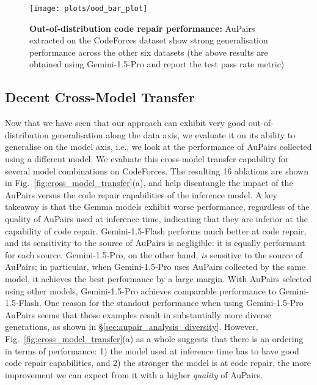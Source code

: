 \documentclass[11pt, a4paper, logo, copyright]{googledeepmind}
\def\aupairs/{\textcolor{golden}{Au}Pairs}
\begin{document}
\begin{figure}[t!]
    \centering
        \texttt{[image: plots/ood\_bar\_plot]}
        \caption{\textbf{Out-of-distribution code repair performance:} \aupairs/ extracted on the CodeForces dataset show strong generalisation performance across the other six datasets (the above results are obtained using Gemini-1.5-Pro and report the test pass rate metric)}
        \label{fig:ood_generalisation}
\end{figure}



\subsection{Decent Cross-Model Transfer}
\label{sec:model_transfer_analysis}

Now that we have seen that our approach can exhibit very good out-of-distribution generalisation along the data axis, we evaluate it on its ability to generalise on the model axis, i.e., we look at the performance of \aupairs/ collected using a different model. We evaluate this cross-model transfer capability for several model combinations on CodeForces. The resulting 16 ablations are shown in Fig.~\ref{fig:cross_model_transfer}(a), and help disentangle the impact of the \aupairs/ versus the code repair capabilities of the inference model. A key takeaway is that the Gemma models exhibit worse performance, regardless of the quality of \aupairs/ used at inference time, indicating that they are inferior at the capability of code repair. Gemini-1.5-Flash performs much better at code repair, and its sensitivity to the source of \aupairs/ is negligible: it is equally performant for each source. Gemini-1.5-Pro, on the other hand, \emph{is} sensitive to the source of \aupairs/; in particular, when Gemini-1.5-Pro uses \aupairs/ collected by the same model, it achieves the best performance by a large margin. With \aupairs/ selected using other models, Gemini-1.5-Pro achieves comparable performance to Gemini-1.5-Flash. One reason for the standout performance when using Gemini-1.5-Pro \aupairs/ seems that those examples result in substantially more diverse generations, as shown in  \S\ref{sec:aupair_analysis_diversity}. However, Fig.~\ref{fig:cross_model_transfer}(a) as a whole suggests that there is an ordering in terms of performance: 1) the model used at inference time has to have good code repair capabilities, and 2) the stronger the model is at code repair, the more improvement we can expect from it with a higher \emph{quality} of \aupairs/.
\end{document}
